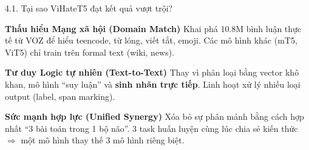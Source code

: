 \documentclass[11pt, aspectratio=169]{beamer}
\begin{document}
\begin{frame}{4.1. Tại sao ViHateT5 đạt kết quả vượt trội?}
\scriptsize

\begin{block}{\textbf{Thấu hiểu Mạng xã hội (Domain Match)}}
  Khai phá 10.8M bình luận thực tế từ VOZ để hiểu teencode, từ lóng, viết tắt, emoji. Các mô hình khác (mT5, ViT5) chỉ train trên formal text (wiki, news).
\end{block}

\begin{block}{\textbf{Tư duy Logic tự nhiên (Text-to-Text)}}
  Thay vì phân loại bằng vector khô khan, mô hình ``suy luận'' và \textbf{sinh nhãn trực tiếp}. Linh hoạt xử lý nhiều loại output (label, span marking).
\end{block}

\begin{block}{\textbf{Sức mạnh hợp lực (Unified Synergy)}}
  Xóa bỏ sự phân mảnh bằng cách hợp nhất ``3 bài toán trong 1 bộ não''. 3 task huấn luyện cùng lúc chia sẻ kiến thức $\Rightarrow$ một mô hình thay thế 3 mô hình riêng biệt.
\end{block}
\end{frame}
\end{document}
